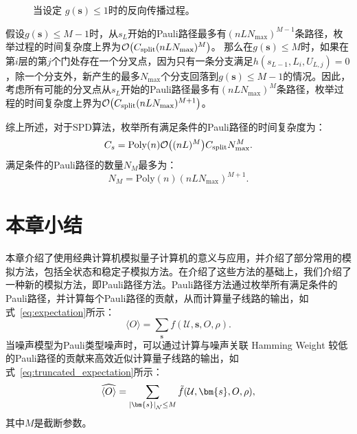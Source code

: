 \begin{figure}[htbp]
    \centering
    \caption{当设定 $g(\bm{s})\leq 1$时的反向传播过程。}\label{fig:bp_tree_ele:spd}
\end{figure}
假设$g(\bm{s})\leq M-1$时，从$s_L$开始的Pauli路径最多有$(nLN_{\text{max}})^{M-1}$条路径，枚举过程的时间复杂度上界为$\order{C_{\text{split}}(nLN_{\text{max}})^{M}}$。
那么在$g(\bm{s})\leq M$时，如果在第$i$层的第$j$个门处存在一个分叉点，因为只有一条分支满足$h(s_{L-1},L_i,U_{L,j})=0$，除一个分支外，新产生的最多$N_{\max}$个分支回落到$g(\bm{s})\leq M-1$的情况。因此，考虑所有可能的分叉点从$s_L$开始的Pauli路径最多有$(nLN_{\text{max}})^{M}$条路径，枚举过程的时间复杂度上界为$\order{C_{\text{split}}(nLN_{\text{max}})^{M+1}}$。

综上所述，对于SPD算法，枚举所有满足条件的Pauli路径的时间复杂度为：
\begin{equation}\label{eq:spd:cost_s}
    C_s=\mathrm{Poly}(n) \order{(nL)^{M}} C_{\text{split}} N_{\text{max}}^{M}.
\end{equation}
满足条件的Pauli路径的数量$N_M$最多为：
\begin{equation}\label{eq:spd:N_M}
    N_M=\mathrm{Poly}(n) (nLN_{\text{max}})^{M+1}.
\end{equation}

\section{本章小结}


本章介绍了使用经典计算机模拟量子计算机的意义与应用，并介绍了部分常用的模拟方法，包括全状态和稳定子模拟方法。在介绍了这些方法的基础上，我们介绍了一种新的模拟方法，即Pauli路径方法。Pauli路径方法通过枚举所有满足条件的Pauli路径，并计算每个Pauli路径的贡献，从而计算量子线路的输出，如式~\eqref{eq:expectation}所示：
\begin{equation*}
    \langle O \rangle = \sum_{\bm{s}} f(\mathcal{U},\bm{s},O,\rho).
\end{equation*}
当噪声模型为Pauli类型噪声时，可以通过计算与噪声关联 Hamming Weight 较低的Pauli路径的贡献来高效近似计算量子线路的输出，如式~\eqref{eq:truncated_expectation}所示：
\begin{equation*}
    \widehat{\langle O \rangle} = \sum_{\abs{\bm{s}}_{\mathcal{N}}\leq M} \tilde{f}(\mathcal{U},\bm{s},O,\rho),
\end{equation*}
其中$M$是截断参数。

